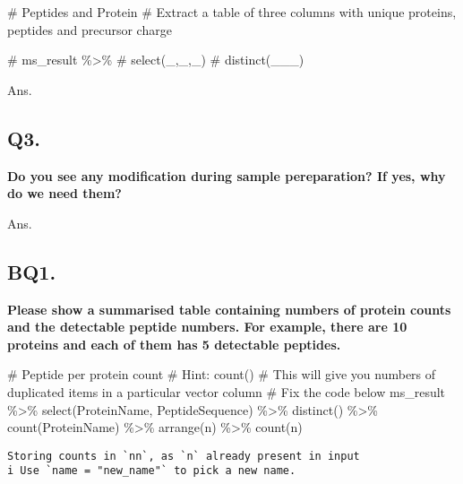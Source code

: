 \documentclass[
  letterpaper,
  DIV=11,
  numbers=noendperiod]{scrartcl}
\newenvironment{Shaded}{\begin{snugshade}}{\end{snugshade}}
\newcommand{\CommentTok}[1]{\textcolor[rgb]{0.37,0.37,0.37}{#1}}
\newcommand{\FunctionTok}[1]{\textcolor[rgb]{0.28,0.35,0.67}{#1}}
\newcommand{\NormalTok}[1]{\textcolor[rgb]{0.00,0.23,0.31}{#1}}
\newcommand{\SpecialCharTok}[1]{\textcolor[rgb]{0.37,0.37,0.37}{#1}}
\begin{document}
\begin{Shaded}
\begin{Highlighting}[]
\CommentTok{\# Peptides and Protein }
\CommentTok{\# Extract a table of three columns with unique proteins, peptides and precursor charge}

\CommentTok{\# ms\_result \%\textgreater{}\% }
\CommentTok{\#   select(\_,\_,\_) }
\CommentTok{\#   distinct(\_\_\_)}
\end{Highlighting}
\end{Shaded}

Ans.

\subsection{Q3.}\label{q3.}

\textbf{Do you see any modification during sample pereparation? If yes,
why do we need them?}

Ans.

\subsection{BQ1.}\label{bq1.}

\textbf{Please show a summarised table containing numbers of protein
counts and the detectable peptide numbers. For example, there are 10
proteins and each of them has 5 detectable peptides.}

\begin{Shaded}
\begin{Highlighting}[]
\CommentTok{\# Peptide per protein count}
\CommentTok{\# Hint: count()}
\CommentTok{\# This will give you numbers of duplicated items in a particular vector column}
\CommentTok{\# Fix the code below}
\NormalTok{ms\_result }\SpecialCharTok{\%\textgreater{}\%} 
  \FunctionTok{select}\NormalTok{(ProteinName, PeptideSequence) }\SpecialCharTok{\%\textgreater{}\%}
  \FunctionTok{distinct}\NormalTok{() }\SpecialCharTok{\%\textgreater{}\%} 
  \FunctionTok{count}\NormalTok{(ProteinName) }\SpecialCharTok{\%\textgreater{}\%} 
  \FunctionTok{arrange}\NormalTok{(n) }\SpecialCharTok{\%\textgreater{}\%} \FunctionTok{count}\NormalTok{(n)}
\end{Highlighting}
\end{Shaded}

\begin{verbatim}
Storing counts in `nn`, as `n` already present in input
i Use `name = "new_name"` to pick a new name.
\end{verbatim}
\end{document}
